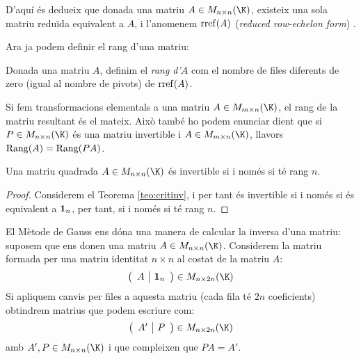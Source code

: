 
\begin{notacio}
	D'aquí és dedueix que donada una matriu $A\in M_{n\times n}(\K)$, existeix una sola matriu reduïda equivalent a $A$, i l'anomenem $\operatorname{rref}(A)$ (\emph{reduced row-echelon form}) .
\end{notacio}
Ara ja podem definir el rang d'una matriu:
\begin{definicio}
	Donada una matriu $A$, definim el \emph{rang d'$A$} com el nombre de files diferents de zero (igual al nombre de pivots) de $\operatorname{rref}(A)$.
\end{definicio}
\begin{corollari}
	Si fem transformacions elementals a una matriu $A\in M_{m\times n}(\K)$, el rang de la matriu resultant és el mateix. Això també ho podem enunciar dient que si $P\in M_{n\times n}(\K)$ és una matriu invertible i $A\in M_{m\times n}(\K)$, llavors $\operatorname{Rang}(A)=\operatorname{Rang}(PA)$.
\end{corollari}
\begin{corollari}
	Una matriu quadrada $A\in M_{n\times n}(\K)$ és invertible si i només si té rang $n$.
\end{corollari}
\begin{proof}
	Considerem el Teorema \ref{teo:critinv}, i per tant és invertible si i només si és equivalent a $\mathbf{1}_n$, per tant, si i només si té rang $n$.
\end{proof}
El Mètode de Gauss ens dóna una manera de calcular la inversa d'una matriu: suposem que ens donen una matriu $A \in M_{n\times n}(\K)$. Considerem la matriu formada per una matriu identitat $n\times n$ al costat de la matriu $A$:
$$
\left(\begin{array}{c|c}A & \1_n \end{array}\right) \in M_{n\times 2n}(\K)
$$
Si apliquem canvis per files a aquesta matriu (cada fila té $2n$ coeficients) obtindrem matrius que podem escriure com:
$$
\left(\begin{array}{c|c}A'& P \end{array}\right) \in M_{n\times 2n}(\K)
$$
amb $A',P\in M_{n\times n}(\K)$ i que compleixen que $PA=A'$.


